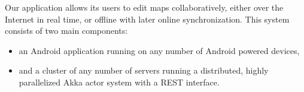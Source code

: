 Our application allows its users to edit maps collaboratively, either over the Internet in real time, or offline with later online synchronization. This system consists of two main components:

\begin{itemize}
	\item an Android application running on any number of Android powered devices,
	\item and a cluster of any number of servers running a distributed, highly parallelized Akka actor system with a REST interface.
\end{itemize}





